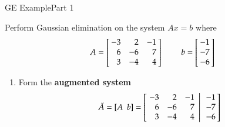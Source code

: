 \documentclass[10pt]{beamer}
\begin{document}
\begin{frame}{GE Example}{Part 1}

\begin{example}
Perform Gaussian elimination on the system $Ax=b$ where 
\begin{equation*}
    A = \left[\negthickspace\begin{array}{rrr} -3 &  2 & -1  \\
                                                6 & -6 &  7 \\
                                                3 & -4 &  4 \end{array}\negthickspace\right]
    \ \ \ \ \ \ \ \ \
    b = \left[\negthickspace\begin{array}{r} -1 \\ -7 \\ -6 \end{array}\negthickspace\right]
\end{equation*}
\end{example}
\begin{enumerate}
    \item[1.] Form the\textbf{ augmented system}
\begin{equation*}
    \tilde{A} = \left[ A\ \ b \right] =
      \left[
           \left.\negthickspace\begin{array}{rrr}  -3 &  2 & -1  \\
                                                    6 & -6 &  7 \\
                                                    3 & -4 &  4 \end{array}
           \right|\begin{array}{r} -1 \\ -7 \\ -6 \end{array}\negthickspace\right]
\end{equation*}
\end{enumerate}
\end{frame}

\end{document}
